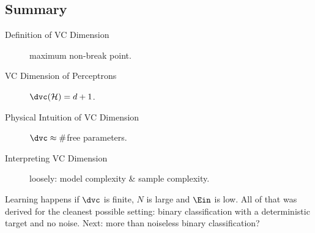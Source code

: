 \hrulebar

\subsection*{Summary}

\begin{description}
    \item[Definition of VC Dimension] maximum non-break point.
    \item[VC Dimension of Perceptrons] \(\dvc(\mathcal{H}) = d + 1\).
    \item[Physical Intuition of VC Dimension] \(\dvc \approx \#\)free
        parameters.
    \item[Interpreting VC Dimension] loosely: model complexity \& sample
        complexity.
\end{description}

Learning happens if \(\dvc\) is finite, \(N\) is large and \(\Ein\) is low. All
of that was derived for the cleanest possible setting: binary classification
with a deterministic target and no noise. Next: more than noiseless binary
classification?
